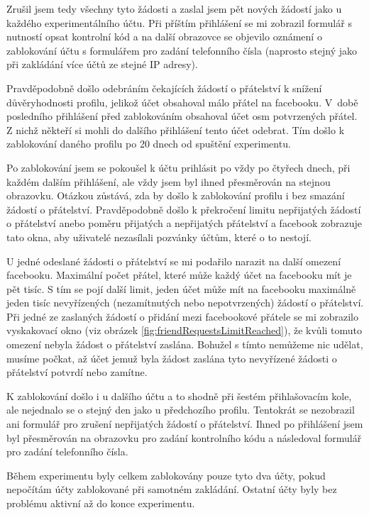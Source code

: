 \documentclass[thesis=M,czech]{FITthesis}[2013/05/10]
\begin{document}
Zrušil jsem tedy všechny tyto žádosti a zaslal jsem pět nových žádostí jako u každého experimentálního účtu. Při příštím přihlášení se mi zobrazil formulář s nutností opsat kontrolní kód a na další obrazovce se objevilo oznámení o zablokování účtu s formulářem pro zadání telefonního čísla (naprosto stejný jako při zakládání více účtů ze stejné IP adresy).

Pravděpodobně došlo odebráním čekajících žádostí o přátelství k snížení důvěryhodnosti profilu, jelikož účet obsahoval málo přátel na facebooku. V~době posledního přihlášení před zablokováním obsahoval účet osm potvrzených přátel. Z nichž někteří si mohli do dalšího přihlášení tento účet odebrat. Tím došlo k zablokování daného profilu po 20 dnech od spuštění experimentu. 

Po zablokování jsem se pokoušel k účtu prihlásit po vždy po čtyřech dnech, při každém dalším přihlášení, ale vždy jsem byl ihned přesměrován na stejnou obrazovku. Otázkou zůstává, zda by došlo k zablokování profilu i bez smazání žádostí o přátelství. Pravděpodobně došlo k překročení limitu nepřijatých žádostí o přátelství anebo poměru přijatých a nepřijatých přátelství a facebook zobrazuje tato okna, aby uživatelé nezasílali pozvánky účtům, které o to nestojí.

U jedné odeslané žádosti o přátelství se mi podařilo narazit na další omezení facebooku. Maximální počet přátel, které může každý účet na facebooku mít je pět tisíc. S tím se pojí další limit, jeden účet může mít na facebooku maximálně jeden tisíc nevyřízených (nezamítnutých nebo nepotvrzených) žádostí o přátelství. Při jedné ze zaslaných žádostí o přidání mezi facebookové přátele se mi zobrazilo vyskakovací okno (viz obrázek \ref{fig:friendRequestsLimitReached}), že kvůli tomuto omezení nebyla žádost o přátelství zaslána. Bohužel s tímto nemůžeme nic udělat, musíme počkat, až účet jemuž byla žádost zaslána tyto nevyřízené žádosti o přátelství potvrdí nebo zamítne.

K zablokování došlo i u dalšího účtu a to shodně při šestém přihlašovacím kole, ale nejednalo se o stejný den jako u předchozího profilu. Tentokrát se nezobrazil ani formulář pro zrušení nepřijatých žádostí o přátelství. Ihned po přihlášení jsem byl přesměrován na obrazovku pro zadání kontrolního kódu a následoval formulář pro zadání telefonního čísla.

Během experimentu byly celkem zablokovány pouze tyto dva účty, pokud nepočítám účty zablokované při samotném zakládání. Ostatní účty byly bez problému aktivní až do konce experimentu.
\end{document}
